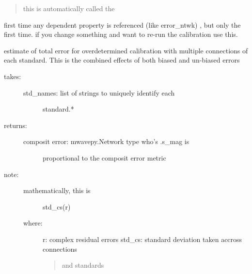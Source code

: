 \documentclass[letterpaper,10pt,english]{sphinxmanual}
\begin{document}
\begin{fulllineitems}
\begin{fulllineitems}
\begin{quote}
this is automatically called the
\end{quote}

first time      any dependent property is referenced (like error\_ntwk)
, but only the first time. if you change something and want to
re-run the calibration use this.

\end{fulllineitems}


\begin{fulllineitems}
\label{api/mwavepy.calibration:mwavepy.calibration.calibration.Calibration.total_error}
estimate of total error for overdetermined calibration with
multiple connections of each standard. This is the combined 
effects of both biased and un-biased errors
\begin{description}
\item[{takes:}] \leavevmode\begin{description}
\item[{std\_names: list of strings to uniquely identify each}] \leavevmode
standard.*

\end{description}

\item[{returns:}] \leavevmode\begin{description}
\item[{composit error: mwavepy.Network type who's .s\_mag is }] \leavevmode
proportional to the composit error metric

\end{description}

\item[{note:}] \leavevmode\begin{description}
\item[{mathematically, this is }] \leavevmode
std\_cs(r)

\item[{where:}] \leavevmode
r: complex residual errors
std\_cs: standard deviation taken accross connections
\begin{quote}

and standards
\end{quote}

\end{description}

\end{description}


\end{fulllineitems}
\end{fulllineitems}
\end{document}

